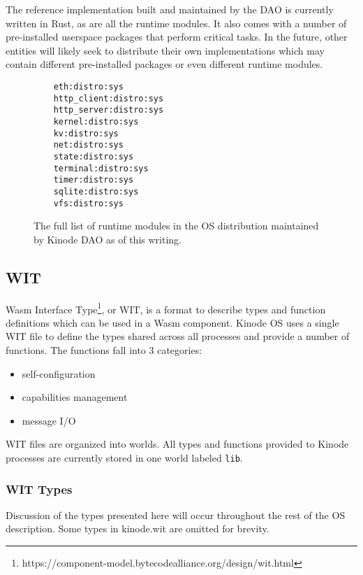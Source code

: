\documentclass[runningheads]{llncs}
\begin{document}
The reference implementation built and maintained by the DAO is currently written in Rust, as are all the runtime modules.
It also comes with a number of pre-installed userspace packages that perform critical tasks.
In the future, other entities will likely seek to distribute their own implementations which may contain different pre-installed packages or even different runtime modules.

\begin{figure}
    \centering
    \begin{lstlisting}
    eth:distro:sys
    http_client:distro:sys
    http_server:distro:sys
    kernel:distro:sys
    kv:distro:sys
    net:distro:sys
    state:distro:sys
    terminal:distro:sys
    timer:distro:sys
    sqlite:distro:sys
    vfs:distro:sys
    \end{lstlisting}
    \caption{The full list of runtime modules in the OS distribution maintained by Kinode DAO as of this writing.}
    \label{fig:runtime modules list}
\end{figure}

\subsection{WIT}

Wasm Interface Type\footnote{https://component-model.bytecodealliance.org/design/wit.html}, or WIT, is a format to describe types and function definitions which can be used in a Wasm component.
Kinode OS uses a single WIT file to define the types shared across all processes and provide a number of functions.
The functions fall into 3 categories:
\begin{itemize}
    \item self-configuration
    \item capabilities management
    \item message I/O
\end{itemize}

WIT files are organized into worlds. All types and functions provided to Kinode processes are currently stored in one world labeled \verb|lib|.

\subsubsection{WIT Types}

Discussion of the types presented here will occur throughout the rest of the OS description.
Some types in kinode.wit are omitted for brevity.
\end{document}
